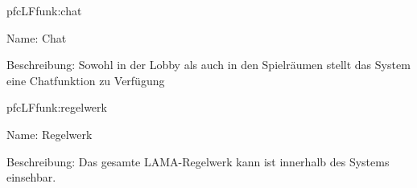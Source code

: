 \begin{description}[leftmargin=5em, style=sameline]
	\begin{lhp}{pfc}{LF}{funk:chat}
		\item [Name:] Chat
		\item [Beschreibung:]
		Sowohl in der Lobby als auch in den Spielräumen stellt das System eine Chatfunktion zu Verfügung
	\end{lhp}
	
		\begin{lhp}{pfc}{LF}{funk:regelwerk}
		\item [Name:]Regelwerk
		\item [Beschreibung:]
	    Das gesamte LAMA-Regelwerk kann ist innerhalb des Systems einsehbar.
	\end{lhp}
\end{description}


